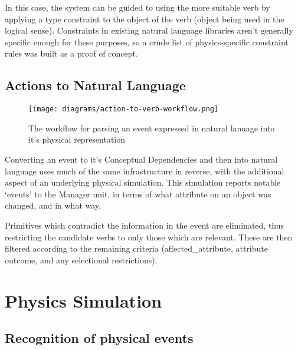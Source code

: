     In this case, the system can be guided to using the more suitable verb by applying a type constraint to the object of the verb (object being used in the logical sense). Constraints in existing natural language libraries aren't generally specific enough for these purposes, so a crude list of physics-specific constraint rules was built as a proof of concept.
    
    \subsection{Actions to Natural Language}
    \begin{figure}[h]
        \begin{center}        
            \texttt{[image: diagrams/action-to-verb-workflow.png]}
        \end{center}
        \caption{The workflow for parsing an event expressed in natural lanuage into it's physical representation}
    \end{figure}

    Converting an event to it's Conceptual Dependencies and then into natural language uses much of the same infrastructure in reverse, with the additional aspect of an underlying physical simulation. This simulation reports notable `events' to the Manager unit, in terms of what attribute on an object was changed, and in what way.

    Primitives which contradict the information in the event are eliminated, thus restricting the candidate verbs to only those which are relevant. These are then filtered according to the remaining criteria (affected\_attribute, attribute outcome, and any selectional restrictions).

    \section{Physics Simulation}
    \subsection{Recognition of physical events}


% 